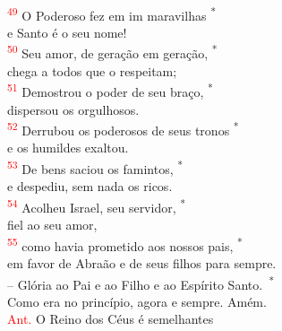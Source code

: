 \documentclass{book}
\begin{document}
\begin{center}
    \vspace{.2cm} \\
    \textsuperscript{\underline{\hspace{.07in}}\textcolor{red}{49}} O Poderoso fez em im maravilhas \textsuperscript{*} \\
    e Santo é o seu nome! \\
    \textsuperscript{\underline{\hspace{.07in}}\textcolor{red}{50}} Seu amor, de geração em geração, \textsuperscript{*} \\
    chega a todos que o respeitam;
    \vspace{.2cm} \\
    \textsuperscript{\underline{\hspace{.07in}}\textcolor{red}{51}} Demostrou o poder de seu braço, \textsuperscript{*} \\
    dispersou os orgulhosos. \\
    \textsuperscript{\underline{\hspace{.07in}}\textcolor{red}{52}} Derrubou os poderosos de seus tronos \textsuperscript{*} \\
    e os humildes exaltou.
    \vspace{.2cm} \\
    \textsuperscript{\underline{\hspace{.07in}}\textcolor{red}{53}} De bens saciou os famintos, \textsuperscript{*}\\
    e despediu, sem nada os ricos. \\
    \textsuperscript{\underline{\hspace{.07in}}\textcolor{red}{54}} Acolheu Israel, seu servidor, \textsuperscript{*} \\
    fiel ao seu amor,
    \vspace{.2cm} \\
    \textsuperscript{\underline{\hspace{.07in}}\textcolor{red}{55}} como havia prometido aos nossos pais, \textsuperscript{*} \\
    em favor de Abraão e de seus filhos para sempre.
    \vspace{.2cm} \\
    -- Glória ao Pai e ao Filho e ao Espírito Santo.\ \textsuperscript{*} \\
    Como era no princípio, agora e sempre. Amém.
    \vspace{.2cm} \\
    \textcolor{red}{Ant.} O Reino dos Céus é semelhantes \\

\end{center}
\end{document}
